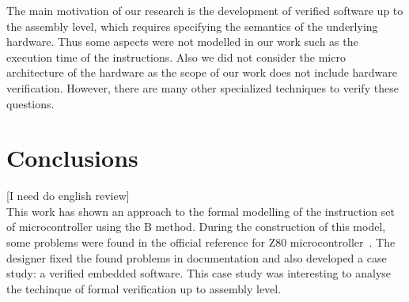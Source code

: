 \documentclass[11pt]{article} %
\begin{document}
The main motivation of our research is the development of verified
software up to the assembly level, which requires specifying the
semantics of the underlying hardware. Thus some aspects were not
modelled in our work such as the execution time of the instructions.
Also we did not consider the micro architecture of the hardware as the scope of
our work does not include hardware verification. However, there are
many other specialized techniques to verify these questions.
 
\section{Conclusions}
\label{sec:conclusions} 
[I need do english review]\\
This work has shown an approach to the formal modelling of the instruction set of
microcontroller using the B method. During the construction of this model, some
problems were found in the official reference for Z80
microcontroller~\cite{Z80_manual}. The designer fixed the found problems in
documentation and also developed a case study: a verified embedded software. This
case study was interesting to analyse the techinque of formal verification up to
assembly level. 
% 
% 
\end{document}
